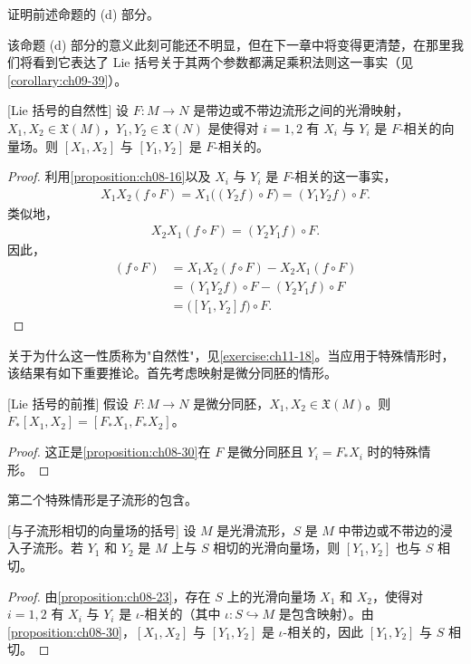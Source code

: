 \documentclass[../../main.tex]{subfiles}
\begin{document}
\begin{exercise}\label{exercise:ch08-29}
证明前述命题的 (d) 部分。
\end{exercise}

该命题 (d) 部分的意义此刻可能还不明显，但在下一章中将变得更清楚，在那里我们将看到它表达了 Lie 括号关于其两个参数都满足乘积法则这一事实（见\cref{corollary:ch09-39}）。

\begin{proposition}\label{proposition:ch08-30}[Lie 括号的自然性]
设 $F\colon M\to N$ 是带边或不带边流形之间的光滑映射，$X_1,X_2\in\mathfrak{X}(M)$，$Y_1,Y_2\in\mathfrak{X}(N)$ 是使得对 $i=1,2$ 有 $X_i$ 与 $Y_i$ 是 $F$-相关的向量场。则 $[X_1,X_2]$ 与 $[Y_1,Y_2]$ 是 $F$-相关的。
\end{proposition}

\begin{proof}
利用\cref{proposition:ch08-16}以及 $X_i$ 与 $Y_i$ 是 $F$-相关的这一事实，
\begin{align*}
X_1X_2(f\circ F)=X_1\bigl((Y_2f)\circ F\bigr)=(Y_1Y_2f)\circ F.
\end{align*}
类似地，
\begin{align*}
X_2X_1(f\circ F)=(Y_2Y_1f)\circ F.
\end{align*}
因此，
\begin{align*}
[X_1,X_2](f\circ F)&=X_1X_2(f\circ F)-X_2X_1(f\circ F)\\
&=(Y_1Y_2f)\circ F-(Y_2Y_1f)\circ F\\
&=\bigl([Y_1,Y_2]f\bigr)\circ F.
\end{align*}
\end{proof}

关于为什么这一性质称为"自然性"，见\cref{exercise:ch11-18}。当应用于特殊情形时，该结果有如下重要推论。首先考虑映射是微分同胚的情形。

\begin{corollary}\label{corollary:ch08-31}[Lie 括号的前推]
假设 $F\colon M\to N$ 是微分同胚，$X_1,X_2\in\mathfrak{X}(M)$。则 $F_*[X_1,X_2]=[F_*X_1,F_*X_2]$。
\end{corollary}

\begin{proof}
这正是\cref{proposition:ch08-30}在 $F$ 是微分同胚且 $Y_i=F_*X_i$ 时的特殊情形。
\end{proof}

第二个特殊情形是子流形的包含。

\begin{corollary}\label{corollary:ch08-32}[与子流形相切的向量场的括号]
设 $M$ 是光滑流形，$S$ 是 $M$ 中带边或不带边的浸入子流形。若 $Y_1$ 和 $Y_2$ 是 $M$ 上与 $S$ 相切的光滑向量场，则 $[Y_1,Y_2]$ 也与 $S$ 相切。
\end{corollary}

\begin{proof}
由\cref{proposition:ch08-23}，存在 $S$ 上的光滑向量场 $X_1$ 和 $X_2$，使得对 $i=1,2$ 有 $X_i$ 与 $Y_i$ 是 $\iota$-相关的（其中 $\iota\colon S\hookrightarrow M$ 是包含映射）。由\cref{proposition:ch08-30}，$[X_1,X_2]$ 与 $[Y_1,Y_2]$ 是 $\iota$-相关的，因此 $[Y_1,Y_2]$ 与 $S$ 相切。
\end{proof}
\end{document}
